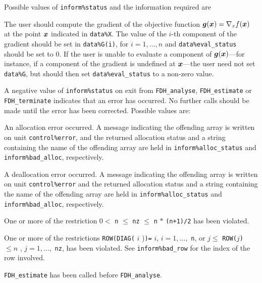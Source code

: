\documentclass{galahad}
\newcommand{\packagename}{FDH}
\begin{document}
Possible values of {\tt inform\%status} and the information required are
\begin{description}
 The user should compute the gradient 
     of the objective function ${\bm{g}}({\bm{x}}) = \nabla_x f({\bm{x}})$ at the 
     point ${\bm{x}}$ indicated in {\tt data\%X}.
     The value of the $i$-th component of the gradient should be set 
     in {\tt data\%G(i)},      for $i = 1, \ldots, n$ and 
     {\tt data\%eval\_status} should be set to 0. If the user is
     unable to evaluate a component of ${\bm{g}}({\bm{x}})$---for instance, 
     if a component of the gradient is
     undefined at ${\bm{x}}$---the user need not set {\tt data\%G}, but
     should then set {\tt data\%eval\_status} to a non-zero value.
\end{description}



\galerrors
A negative value of {\tt inform\%status} on exit from 
{\tt \packagename\_analyse},
{\tt \packagename\_estimate}
or 
{\tt \packagename\_terminate}
indicates that an error has occurred. No further calls should be made
until the error has been corrected. Possible values are:

\begin{description}

 An allocation error occurred. 
A message indicating the offending
array is written on unit {\tt control\%error}, and the returned allocation 
status and a string containing the name of the offending array
are held in {\tt inform\%alloc\_\-status}
and {\tt inform\%bad\_alloc}, respectively.

 A deallocation error occurred. 
A message indicating the offending 
array is written on unit {\tt control\%error} and the returned allocation 
status and a string containing the name of the offending array
are held in {\tt inform\%alloc\_\-status}
and {\tt inform\%bad\_alloc}, respectively.

 One or more of the restriction 
$0 <$ {\tt n} $\le$ {\tt nz} $\le$ {\tt n} $\ast$ {\tt (n+1)/2}
  has been violated.

 One or more of the restrictions
{\tt ROW(DIAG(} $i$ {)\tt)=} $i$, $i = 1, \ldots,$ {\tt n}, or
$j \leq$ {\tt ROW(}$j${\tt)} $\leq n$ , $j = 1, \ldots,$ {\tt nz},
  has been violated. See {\tt inform\%bad\_row} 
for the index of the row involved.

  {\tt \packagename\_estimate} has been called
before {\tt \packagename\_analyse}. 

\end{description}
\end{document}
